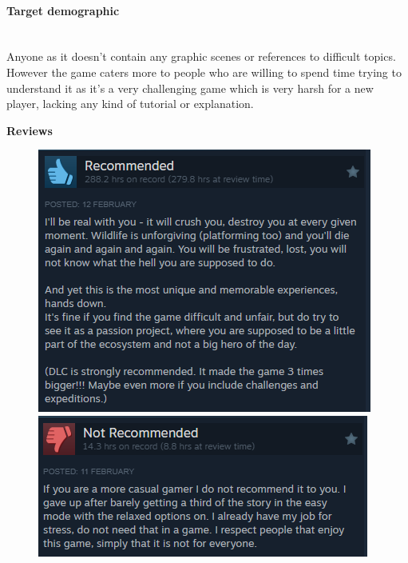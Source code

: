 \documentclass{article}
\newcommand{\myparagraph}[1]{\paragraph{#1}\mbox{}\\} %
\newcommand{\smallBr}{\vspace{1.5mm}}
\begin{document}
\myparagraph{Target demographic}
Anyone as it doesn't contain any graphic scenes or references to difficult topics. However the game caters more to people who are willing to spend time trying to understand it as it's a very challenging game which is very harsh for a new player, lacking any kind of tutorial or explanation. 

\smallBr
\textbf{Reviews} \linebreak
\begin{figure}[h]
\centering
\begin{minipage}{0.4\linewidth}
\includegraphics[width=\linewidth]{Rain World review 1}
\smallBr
\includegraphics[width=\linewidth]{Rain World review 2}
\end{minipage}
\begin{minipage}{0.4\linewidth}

\end{minipage}
\end{figure}
\end{document}
